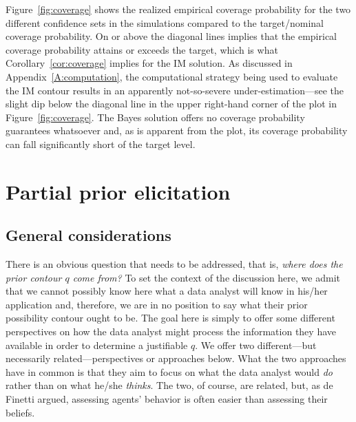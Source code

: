 \documentclass[12pt]{article}
\begin{document}
Figure~\ref{fig:coverage} shows the realized empirical coverage probability for the two different confidence sets in the simulations compared to the target/nominal coverage probability.  On or above the diagonal lines implies that the empirical coverage probability attains or exceeds the target, which is what Corollary~\ref{cor:coverage} implies for the IM solution.  As discussed in Appendix~\ref{A:computation}, the computational strategy being used to evaluate the IM contour results in an apparently not-so-severe under-estimation---see the slight dip below the diagonal line in the upper right-hand corner of the plot in Figure~\ref{fig:coverage}.  The Bayes solution offers no coverage probability guarantees whatsoever and, as is apparent from the plot, its coverage probability can fall significantly short of the target level.  





\section{Partial prior elicitation} 
\label{sec:prior_contour}

\subsection{General considerations}

There is an obvious question that needs to be addressed, that is, {\em where does the prior contour $q$ come from?}  To set the context of the discussion here, we admit that we cannot possibly know here what a data analyst will know in his/her application and, therefore, we are in no position to say what their prior possibility contour ought to be.  The goal here is simply to offer some different perspectives on how the data analyst might process the information they have available in order to determine a justifiable $q$.  We offer two different---but necessarily related---perspectives or approaches below.  What the two approaches have in common is that they aim to focus on what the data analyst would {\em do} rather than on what he/she {\em thinks}.  The two, of course, are related, but, as de Finetti argued, assessing agents' behavior is often easier than assessing their beliefs.  
\end{document}
